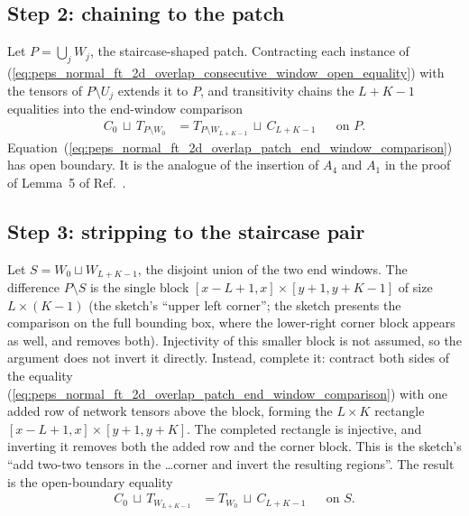 \documentclass{article}
\begin{document}
\subsection{Step 2: chaining to the patch}

Let $P = \bigcup_j W_j$, the staircase-shaped patch. Contracting each
instance of
(\ref{eq:peps_normal_ft_2d_overlap_consecutive_window_open_equality}) with
the tensors of $P \setminus U_j$
extends it to $P$, and transitivity chains the $L+K-1$ equalities into
the end-window comparison
\begin{align}
    C_0 \,\sqcup\, T_{P \setminus W_0}
     & = T_{P \setminus W_{L+K-1}} \,\sqcup\, C_{L+K-1}
     &                                                  & \text{on } P.
    \label{eq:peps_normal_ft_2d_overlap_patch_end_window_comparison}
\end{align}
Equation~(\ref{eq:peps_normal_ft_2d_overlap_patch_end_window_comparison})
has open boundary. It is the analogue of the insertion of $A_4$ and $A_1$ in
the proof of Lemma~5 of Ref.~\cite{Molnar2018NormalPEPS}.

\subsection{Step 3: stripping to the staircase pair}

Let $S = W_0 \sqcup W_{L+K-1}$, the disjoint union of the two end
windows. The difference $P \setminus S$ is the single block
$[x-L+1, x] \times [y+1, y+K-1]$ of size $L \times (K-1)$ (the sketch's
``upper left corner''; the sketch presents the comparison on the full
bounding box, where the lower-right corner block appears as well, and
removes both). Injectivity of this smaller block is not assumed, so the
argument does not invert it directly. Instead, complete it: contract both sides of the
equality (\ref{eq:peps_normal_ft_2d_overlap_patch_end_window_comparison})
with one added row of network tensors above the block,
forming the $L \times K$ rectangle $[x-L+1,x] \times [y+1, y+K]$. The
completed rectangle is injective, and inverting it removes both the
added row and the corner block. This is the sketch's ``add two-two
tensors in the \dots corner and invert the resulting regions''. The
result is the open-boundary equality
\begin{align}
    C_0 \,\sqcup\, T_{W_{L+K-1}}
     & = T_{W_0} \,\sqcup\, C_{L+K-1}
     &                                & \text{on } S.
    \label{eq:peps_normal_ft_2d_overlap_staircase_pair_open_equality}
\end{align}
\end{document}
